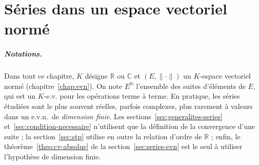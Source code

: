 \chapter{Séries dans un espace vectoriel normé}
\label{chap:series-evn}

\paragraph{Notations.} Dans tout ce chapitre, $K$ désigne $\mathbb{R}$ ou $\mathbb{C}$ et $(E,\|\cdot\|)$ un $K$-espace vectoriel normé (chapitre~\ref{chap:evn}). On note $E^{\mathbb{N}}$ l'ensemble des suites d'éléments de $E$, qui est un $K$-e.v. pour les opérations terme à terme. En pratique, les séries étudiées sont le plus souvent réelles, parfois complexes, plus rarement à valeurs dans un e.v.n.\ de \emph{dimension finie}. Les sections~\ref{sec:generalites-series} et~\ref{sec:condition-necessaire} n'utilisent que la définition de la convergence d'une suite ; la section~\ref{sec:stp} utilise en outre la relation d'ordre de $\mathbb{R}$ ; enfin, le théorème~\ref{theo:cv-absolue} de la section~\ref{sec:series-evn} est le seul à utiliser l'hypothèse de dimension finie.

